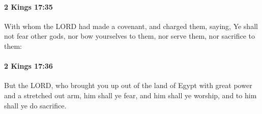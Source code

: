 		\paragraph{2 Kings 17:35} %
			\label{2KINGS-17-35}

			With whom the LORD had made a covenant, and charged them, saying, Ye shall not fear other gods, nor bow yourselves to them, nor serve them, nor sacrifice to them:


		\paragraph{2 Kings 17:36} %
			\label{2KINGS-17-36}

			But the LORD, who brought you up out of the land of Egypt with great power and a stretched out arm, him shall ye fear, and him shall ye worship, and to him shall ye do sacrifice.


